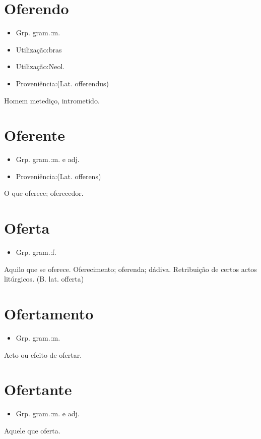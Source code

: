\section{Oferendo}
\begin{itemize}
\item {Grp. gram.:m.}
\end{itemize}
\begin{itemize}
\item {Utilização:bras}
\end{itemize}
\begin{itemize}
\item {Utilização:Neol.}
\end{itemize}
\begin{itemize}
\item {Proveniência:(Lat. \textunderscore offerendus\textunderscore )}
\end{itemize}
Homem metediço, intrometido.
\section{Oferente}
\begin{itemize}
\item {Grp. gram.:m.  e  adj.}
\end{itemize}
\begin{itemize}
\item {Proveniência:(Lat. \textunderscore offerens\textunderscore )}
\end{itemize}
O que oferece; oferecedor.
\section{Oferta}
\begin{itemize}
\item {Grp. gram.:f.}
\end{itemize}
Aquilo que se oferece.
Oferecimento; oferenda; dádiva.
Retribuição de certos actos litúrgicos.
(B. lat. \textunderscore offerta\textunderscore )
\section{Ofertamento}
\begin{itemize}
\item {Grp. gram.:m.}
\end{itemize}
Acto ou efeito de ofertar.
\section{Ofertante}
\begin{itemize}
\item {Grp. gram.:m.  e  adj.}
\end{itemize}
Aquele que oferta.
